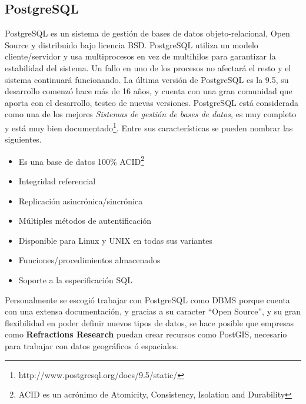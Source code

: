     \subsection{PostgreSQL} %
    \label{sec:postgres}

      PostgreSQL es un sistema de gestión de bases de datos objeto-relacional, Open Source y distribuido bajo licencia BSD.
      PostgreSQL utiliza un modelo cliente/servidor y usa multiprocesos en vez de multihilos para garantizar la estabilidad del sistema. Un fallo en uno de los procesos no afectará el resto y el sistema continuará funcionando.
      La última versi\'on de PostgreSQL es la 9.5, su desarrollo comenz\'o hace más de 16 años, y cuenta con una gran comunidad que aporta con el desarrollo, testeo de nuevas versiones.
      PostgreSQL  está considerada como una de los mejores \emph{Sistemas de gesti\'on de bases de datos}, es muy completo y está muy bien documentado\footnote{ http://www.postgresql.org/docs/9.5/static/}.
      Entre sus características se pueden nombrar las siguientes.
      \begin{itemize}
        \item Es una base de datos 100\% ACID\footnote{  ACID es un acrónimo de Atomicity, Consistency, Isolation and Durability}
        \item Integridad referencial
        \item Replicación asincrónica/sincrónica
        \item Múltiples métodos de autentificación
        \item Disponible para Linux y UNIX en todas sus variantes
        \item Funciones/procedimientos almacenados
        \item Soporte a la especificaci\'on SQL
      \end{itemize}

      Personalmente se escogió trabajar con  PostgreSQL como DBMS
      porque cuenta con una extensa documentación,  y gracias a su caracter ``Open Source'', y su gran flexibilidad en poder definir nuevos tipos de datos,
      se hace posible que empresas como \textbf{Refractions Research} puedan crear recursos como PostGIS, necesario para trabajar con datos geográficos \'o espaciales.


